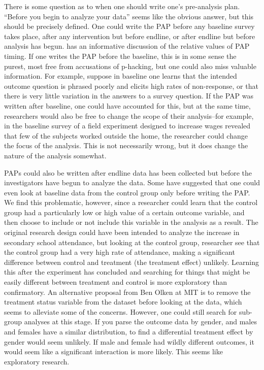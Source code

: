 \documentclass[12pt] {article}
\begin{document}
There is some question as to when one should write one's pre-analysis plan. ``Before you begin to analyze your data'' seems like the obvious answer, but this should be precisely defined. One could write the PAP before any baseline survey takes place, after any intervention but before endline, or after endline but before analysis has begun. \cite{glennerster_running_2013} has an informative discussion of the relative values of PAP timing. If one writes the PAP before the baseline, this is in some sense the purest, most free from accusations of p-hacking, but one could also miss valuable information. For example, suppose in baseline one learns that the intended outcome question is phrased poorly and elicits high rates of non-response, or that there is very little variation in the answers to a survey question. If the PAP was written after baseline, one could have accounted for this, but at the same time, researchers would also be free to change the scope of their analysis--for example, in the baseline survey of a field experiment designed to increase wages revealed that few of the subjects worked outside the home, the researcher could change the focus of the analysis. This is not necessarily wrong, but it does change the nature of the analysis somewhat.

PAPs could also be written after endline data has been collected but before the investigators have begun to analyze the data. Some have suggested that one could even look at baseline data from the control group only before writing the PAP. We find this problematic, however, since a researcher could learn that the control group had a particularly low or high value of a certain outcome variable, and then choose to include or not include this variable in the analysis as a result. The original research design could have been intended to analyze the increase in secondary school attendance, but looking at the control group, researcher see that the control group had a very high rate of attendance, making a significant difference between control and treatment (the treatment effect) unlikely. Learning this after the experiment has concluded and searching for things that might be easily different between treatment and control is more exploratory than confirmatory. An alternative proposal from Ben Olken at MIT is to remove the treatment status variable from the dataset before looking at the data, which seems to alleviate some of the concerns. However, one could still search for sub-group analyses at this stage. If you parse the outcome data by gender, and males and females have a similar distribution, to find a differential treatment effect by gender would seem unlikely. If male and female had wildly different outcomes, it would seem like a significant interaction is more likely. This seems like exploratory research. 
\end{document}

